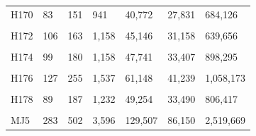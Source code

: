 \documentclass[
  a4paper,
  titlepage]{article}
\begin{document}
\begin{longtable}[t]{lllllll}
H170 & 83 & 151 & 941 & 40,772 & 27,831 & 684,126\\
 
\cellcolor{gray!6}{H171} & \cellcolor{gray!6}{136} & \cellcolor{gray!6}{253} & \cellcolor{gray!6}{1,698} & \cellcolor{gray!6}{63,697} & \cellcolor{gray!6}{42,839} & \cellcolor{gray!6}{1,074,018}\\
 
H172 & 106 & 163 & 1,158 & 45,146 & 31,158 & 639,656\\
 
\cellcolor{gray!6}{H173} & \cellcolor{gray!6}{95} & \cellcolor{gray!6}{184} & \cellcolor{gray!6}{1,180} & \cellcolor{gray!6}{46,331} & \cellcolor{gray!6}{31,786} & \cellcolor{gray!6}{768,954}\\
 
H174 & 99 & 180 & 1,158 & 47,741 & 33,407 & 898,295\\
 
\cellcolor{gray!6}{H175} & \cellcolor{gray!6}{76} & \cellcolor{gray!6}{178} & \cellcolor{gray!6}{1,033} & \cellcolor{gray!6}{41,495} & \cellcolor{gray!6}{28,524} & \cellcolor{gray!6}{805,942}\\
 
H176 & 127 & 255 & 1,537 & 61,148 & 41,239 & 1,058,173\\
 
\cellcolor{gray!6}{H177} & \cellcolor{gray!6}{102} & \cellcolor{gray!6}{206} & \cellcolor{gray!6}{1,339} & \cellcolor{gray!6}{52,022} & \cellcolor{gray!6}{35,297} & \cellcolor{gray!6}{934,161}\\
 
H178 & 89 & 187 & 1,232 & 49,254 & 33,490 & 806,417\\
 
\cellcolor{gray!6}{H179} & \cellcolor{gray!6}{120} & \cellcolor{gray!6}{218} & \cellcolor{gray!6}{1,318} & \cellcolor{gray!6}{51,743} & \cellcolor{gray!6}{35,308} & \cellcolor{gray!6}{894,942}\\
 
MJ5 & 283 & 502 & 3,596 & 129,507 & 86,150 & 2,519,669\\*
\end{longtable}
\end{document}
